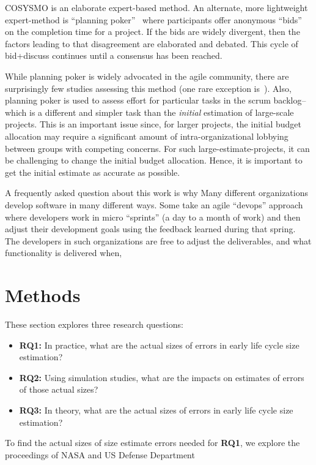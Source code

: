 \documentclass[final,twocolumn,5p]{elsarticle}
\newcommand{\bi}{\begin{itemize}[leftmargin=0.4cm]}
\newcommand{\ei}{\end{itemize}}
\begin{document}
COSYSMO is an elaborate expert-based method. An alternate, more lightweight expert-method is  ``planning poker''~\cite{molokk08} where
participants offer anonymous
``bids'' on the 
completion time for a project. If  the bids are widely divergent, then the factors
leading to that disagreement are elaborated and debated. This cycle of bid+discuss continues
until a consensus has been reached.

While planning poker is widely advocated in the agile community,
there are surprisingly few studies assessing this method (one rare exception is~\cite{molokk08}).
Also,   planning poker is used to assess effort
for particular tasks in the scrum backlog-- which is a different and simpler task
than the {\em initial} estimation of  large-scale
projects. This is an important issue since, for larger
projects, the initial budget allocation may require a significant amount of intra-organizational lobbying between groups with competing concerns. For such large-estimate-projects, it can
be challenging to change the initial budget allocation. Hence, it is important to get
the initial estimate as accurate as possible.


A frequently asked question about this work is why 
Many different organizations develop software in many different ways. Some take an agile ``devops'' approach 
where developers work in micro ``sprints'' (a day to a month of work) and then adjust their development goals using
the 
feedback learned during that spring. The developers in such organizations are free to adjust the deliverables, and
what  functionality is delivered when, 

 

\section{Methods}
These section explores three research questions:
\bi
\item[{\bf RQ1:}] In practice, what are the actual sizes of errors in early life cycle size estimation?
\item[{\bf RQ2:}] Using simulation studies, what are the impacts on estimates of errors of those actual sizes?
  \item[{\bf RQ3:}] In theory, what are the actual sizes of errors in early life cycle size estimation?
    \ei

    To find the actual sizes of size estimate errors needed for {\bf RQ1}, we explore the proceedings
    of NASA and US Defense Department 
\end{document}
